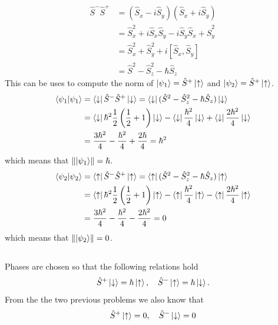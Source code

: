 \documentclass{article}
\begin{document}
\subsection{}
\begin{align*}
\hat{S}^-\hat{S}^+ &=(\hat{S}_x-i\hat{S}_y)(\hat{S}_x+i\hat{S}_y) \\
&= \hat{S}_x^2+i\hat{S}_x\hat{S}_y-i\hat{S}_y\hat{S}_x+\hat{S}_y^2 \\
&= \hat{S}_x^2+\hat{S}_y^2+i[\hat{S}_x,\hat{S}_y] \\
&= \hat{S}^2-\hat{S}_z^2-\hbar\hat{S}_z
\end{align*}
This can be uses to compute the norm of $\ket{\psi_1} = \hat{S}^+\ket{\uparrow}$ and $\ket{\psi_2} = \hat{S}^+\ket{\uparrow}$.
\begin{align*}
\braket{\psi_1} &= \bra{\downarrow}\hat{S}^-\hat{S}^+\ket{\downarrow} = \bra{\downarrow}(\hat{S}^2-\hat{S}_z^2-\hbar\hat{S}_z)\ket{\downarrow} \\
&= \bra{\downarrow}\hbar^2\frac{1}{2}\left(\frac{1}{2} +1 \right)\ket{\downarrow} -\bra{\downarrow}\frac{\hbar^2}{4} \ket{\downarrow} +\bra{\downarrow}\frac{2\hbar^2}{4} \ket{\downarrow} \\
&= \frac{3\hbar^2}{4} -\frac{\hbar^2}{4}+\frac{2\hbar}{4} = \hbar^2 
\end{align*}
which means that $\norm{\ket{\psi_1}} = \hbar$.
\begin{align*}
\braket{\psi_2} &= \bra{\uparrow}\hat{S}^-\hat{S}^+\ket{\uparrow} = \bra{\uparrow}(\hat{S}^2-\hat{S}_z^2-\hbar\hat{S}_z)\ket{\uparrow} \\
&= \bra{\uparrow}\hbar^2\frac{1}{2}\left(\frac{1}{2} +1 \right)\ket{\uparrow} -\bra{\uparrow}\frac{\hbar^2}{4} \ket{\uparrow} -\bra{\uparrow}\frac{2\hbar^2}{4} \ket{\uparrow} \\
&= \frac{3\hbar^2}{4} -\frac{\hbar^2}{4}-\frac{2\hbar^2}{4} = 0
\end{align*}
which means that $\norm{\ket{\psi_2}} = 0$.

\subsection{}

Phases are chosen so that the following relations hold
\begin{equation*}
\hat{S}^+\ket{\downarrow}=\hbar\ket{\uparrow}, \quad \hat{S}^-\ket{\uparrow}=\hbar\ket{\downarrow}.
\end{equation*}
From the the two previous problems we also know that
\begin{equation*}
\hat{S}^+\ket{\uparrow}=0, \quad \hat{S}^-\ket{\downarrow}=0
\end{equation*}
\end{document}

